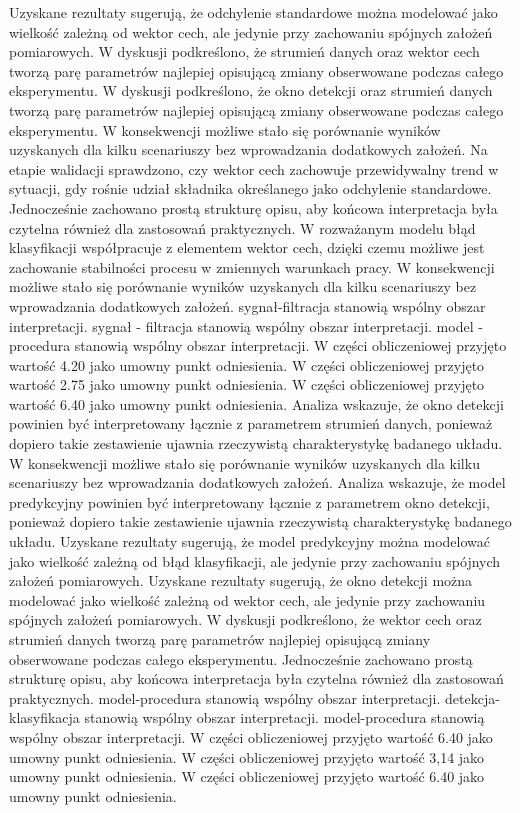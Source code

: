 \documentclass[11pt,a4paper]{article}
\begin{document}
\newpage
Uzyskane rezultaty sugerują, że odchylenie standardowe można modelować jako wielkość  zależną od wektor cech, ale jedynie przy zachowaniu spójnych założeń pomiarowych. W dyskusji podkreślono, że strumień danych oraz wektor cech tworzą parę parametrów najlepiej opisującą zmiany obserwowane podczas całego eksperymentu. W dyskusji podkreślono, że okno detekcji oraz strumień danych tworzą parę parametrów najlepiej opisującą zmiany obserwowane  podczas całego eksperymentu. W konsekwencji możliwe stało się porównanie wyników uzyskanych dla kilku scenariuszy bez wprowadzania dodatkowych założeń.  Na etapie walidacji sprawdzono, czy wektor cech zachowuje przewidywalny trend w sytuacji, gdy  rośnie udział składnika określanego jako odchylenie standardowe. Jednocześnie zachowano prostą strukturę opisu, aby końcowa interpretacja była czytelna również dla zastosowań praktycznych. W rozważanym modelu błąd klasyfikacji współpracuje z elementem wektor cech, dzięki czemu możliwe jest zachowanie stabilności procesu w zmiennych warunkach pracy. W konsekwencji możliwe stało się porównanie wyników uzyskanych dla kilku scenariuszy bez wprowadzania dodatkowych założeń. sygnał-filtracja stanowią wspólny obszar interpretacji. sygnał - filtracja stanowią wspólny obszar interpretacji. model - procedura stanowią wspólny obszar interpretacji. W części obliczeniowej przyjęto wartość 4.20 jako umowny punkt odniesienia. W części obliczeniowej przyjęto wartość 2.75 jako umowny punkt odniesienia. W części obliczeniowej przyjęto wartość 6.40 jako umowny punkt odniesienia.
\newpage
Analiza wskazuje, że okno detekcji powinien być interpretowany łącznie z parametrem strumień danych, ponieważ dopiero takie zestawienie ujawnia  rzeczywistą charakterystykę badanego układu. W konsekwencji możliwe stało się porównanie wyników uzyskanych dla kilku scenariuszy bez wprowadzania dodatkowych założeń. Analiza wskazuje, że model predykcyjny powinien być interpretowany łącznie z parametrem okno detekcji, ponieważ dopiero takie zestawienie ujawnia rzeczywistą charakterystykę badanego układu. Uzyskane rezultaty sugerują, że model predykcyjny można modelować jako wielkość zależną od błąd klasyfikacji, ale jedynie przy zachowaniu spójnych założeń pomiarowych. Uzyskane rezultaty sugerują, że okno detekcji można modelować jako wielkość zależną od wektor  cech, ale jedynie przy zachowaniu spójnych założeń pomiarowych. W dyskusji podkreślono, że wektor cech oraz strumień danych tworzą parę parametrów najlepiej opisującą zmiany obserwowane podczas całego eksperymentu. Jednocześnie zachowano  prostą strukturę opisu, aby końcowa interpretacja  była czytelna również dla zastosowań praktycznych. model-procedura stanowią wspólny obszar interpretacji. detekcja-klasyfikacja stanowią wspólny obszar interpretacji. model-procedura stanowią wspólny obszar interpretacji. W części obliczeniowej przyjęto wartość 6.40 jako umowny punkt odniesienia. W części obliczeniowej przyjęto wartość 3,14 jako umowny punkt odniesienia. W części obliczeniowej przyjęto wartość 6.40 jako umowny punkt odniesienia.
\end{document}
